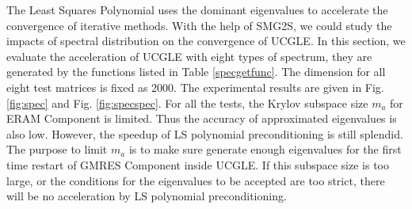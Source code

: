 The Least Squares Polynomial uses the dominant eigenvalues to accelerate the convergence of iterative methods. With the help of SMG2S, we could study the impacts of spectral distribution on the convergence of UCGLE. In this section, we evaluate the acceleration of UCGLE with eight types of spectrum, they are generated by the functions listed in Table \ref{specgetfunc}. The dimension for all eight test matrices is fixed as 2000. The experimental results are given in Fig. \ref{fig:spec} and Fig. \ref{fig:specspec}. For all the tests, the Krylov subspace size $m_a$ for ERAM Component is limited. Thus the accuracy of approximated eigenvalues is also low. However, the speedup of LS polynomial preconditioning is still splendid. The purpose to limit $m_a$ is to make sure generate enough eigenvalues for the first time restart of GMRES Component inside UCGLE. If this subspace size is too large, or the conditions for the eigenvalues to be accepted are too strict, there will be no acceleration by LS polynomial preconditioning.

